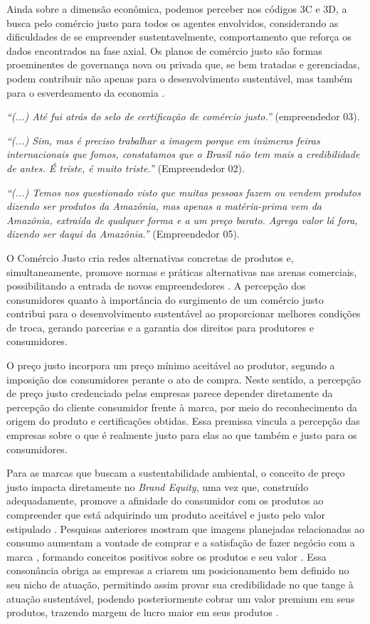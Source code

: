Ainda sobre a dimensão econômica, podemos perceber nos códigos 3C e 3D, a busca pelo comércio justo para todos os agentes envolvidos, considerando as dificuldades de se empreender sustentavelmente, comportamento que reforça os dados encontrados na fase axial. Os planos de comércio justo são formas proeminentes de governança nova ou privada que, se bem tratadas e gerenciadas, podem contribuir não apenas para o desenvolvimento sustentável, mas também para o esverdeamento da economia \cite{Ribeiro-Duthie2021FairEconomy}.

\textit{“(...) Até fui atrás do selo de certificação de comércio justo.”} (empreendedor 03).

\textit{“(...) Sim, mas é preciso trabalhar a imagem porque em inúmeras feiras internacionais que fomos, constatamos que o Brasil não tem mais a credibilidade de antes. É triste, é muito triste.”} (Empreendedor 02).

\textit{“(...) Temos nos questionado visto que muitas pessoas fazem ou vendem produtos dizendo ser produtos da Amazônia, mas apenas a matéria-prima vem da Amazônia, extraída de qualquer forma e a um preço barato. Agrega valor lá fora, dizendo ser daqui da Amazônia.”} (Empreendedor 05).

O Comércio Justo cria redes alternativas concretas de produtos e, simultaneamente, promove normas e práticas alternativas nas arenas comerciais, possibilitando a entrada de novos empreendedores \cite{Raynolds2007Fair/AlternativeDimensions}. A percepção dos consumidores quanto à importância do surgimento de um comércio justo contribui para o desenvolvimento sustentável ao proporcionar melhores condições de troca, gerando parcerias e a garantia dos direitos para produtores e consumidores.

O preço justo incorpora um preço mínimo aceitável ao produtor, segundo a imposição dos consumidores perante o ato de compra. Neste sentido, a percepção de preço justo credenciado pelas empresas parece depender diretamente da percepção do cliente consumidor frente à marca, por meio do reconhecimento da origem do produto e certificações obtidas. Essa premissa vincula a percepção das empresas sobre o que é realmente justo para elas ao que também e justo para os consumidores.

Para as marcas que buscam a sustentabilidade ambiental, o conceito de preço justo impacta diretamente no \textit{Brand Equity}, uma vez que, construído adequadamente, promove a afinidade do consumidor com os produtos ao compreender que está adquirindo um produto aceitável e justo pelo valor estipulado \cite{Ulian2020UnlockingAgriculture}. Pesquisas anteriores mostram que imagens planejadas relacionadas ao consumo aumentam a vontade de comprar e a satisfação de fazer negócio com a marca \cite{Schlosser2003ExperiencingIntentions}, formando conceitos positivos sobre os produtos e seu valor \cite{Chan2018NeuralTemplates}. Essa consonância obriga as empresas a criarem um posicionamento bem definido no seu nicho de atuação, permitindo assim provar sua credibilidade no que tange à atuação sustentável, podendo posteriormente cobrar um valor premium em seus produtos, trazendo margem de lucro maior em seus produtos \cite{Langen2013WhereReality}.

